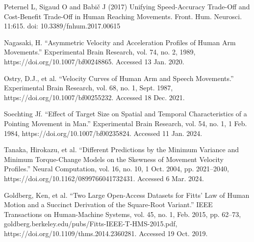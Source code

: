 \documentclass[letterpaper, 10pt, conference]{ieeeconf}
\begin{document}
\begin{thebibliography}{99}
Peternel L, Sigaud O and Babič J (2017) Unifying Speed-Accuracy Trade-Off and Cost-Benefit Trade-Off in Human Reaching Movements. Front. Hum. Neurosci. 11:615. doi: 10.3389/fnhum.2017.00615

Nagasaki, H. “Asymmetric Velocity and Acceleration Profiles of Human Arm Movements.” Experimental Brain Research, vol. 74, no. 2, 1989, https://doi.org/10.1007/bf00248865. Accessed 13 Jan. 2020.

Ostry, D.J., et al. “Velocity Curves of Human Arm and Speech Movements.” Experimental Brain Research, vol. 68, no. 1, Sept. 1987, https://doi.org/10.1007/bf00255232. Accessed 18 Dec. 2021.

Soechting Jf. “Effect of Target Size on Spatial and Temporal Characteristics of a Pointing Movement in Man.” Experimental Brain Research, vol. 54, no. 1, 1 Feb. 1984, https://doi.org/10.1007/bf00235824. Accessed 11 Jan. 2024.

Tanaka, Hirokazu, et al. “Different Predictions by the Minimum Variance and Minimum Torque-Change Models on the Skewness of Movement Velocity Profiles.” Neural Computation, vol. 16, no. 10, 1 Oct. 2004, pp. 2021–2040, https://doi.org/10.1162/0899766041732431. Accessed 6 Mar. 2024.

Goldberg, Ken, et al. “Two Large Open-Access Datasets for Fitts’ Law of Human Motion and a Succinct Derivation of the Square-Root Variant.” IEEE Transactions on Human-Machine Systems, vol. 45, no. 1, Feb. 2015, pp. 62–73, goldberg.berkeley.edu/pubs/Fitts-IEEE-T-HMS-2015.pdf, https://doi.org/10.1109/thms.2014.2360281. Accessed 19 Oct. 2019.

\end{thebibliography}
\end{document}
